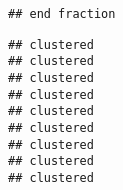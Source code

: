 \documentclass[
]{article}
\begin{document}
\begin{verbatim}
## end fraction
\end{verbatim}

\begin{verbatim}
## clustered
## clustered
## clustered
## clustered
## clustered
## clustered
## clustered
## clustered
## clustered
\end{verbatim}
\end{document}
